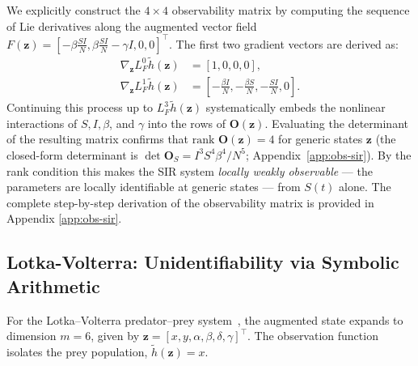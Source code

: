 We explicitly construct the $4 \times 4$ observability matrix by computing the sequence of Lie derivatives along the augmented vector field $F(\mathbf{z}) = [-\beta \frac{SI}{N}, \beta \frac{SI}{N} - \gamma I, 0, 0]^\top$. The first two gradient vectors are derived as:
\begin{align}
    \nabla_{\mathbf{z}} L_{F}^0 \tilde{h}(\mathbf{z}) &= [1, 0, 0, 0], \\
    \nabla_{\mathbf{z}} L_{F}^1 \tilde{h}(\mathbf{z}) &= \left[-\frac{\beta I}{N}, -\frac{\beta S}{N}, -\frac{SI}{N}, 0\right].
\end{align}
Continuing this process up to $L_F^3 \tilde{h}(\mathbf{z})$ systematically embeds the nonlinear interactions of $S, I, \beta$, and $\gamma$ into the rows of $\mathbf{O}(\mathbf{z})$. Evaluating the determinant of the resulting matrix confirms that $\text{rank } \mathbf{O}(\mathbf{z}) = 4$ for generic states $\mathbf{z}$ (the closed-form determinant is $\det\mathbf{O}_S=I^3S^4\beta^4/N^5$; Appendix~\ref{app:obs-sir}). By the rank condition this makes the SIR system \emph{locally weakly observable} --- the parameters are locally identifiable at generic states --- from $S(t)$ alone. The complete step-by-step derivation of the observability matrix is provided in Appendix \ref{app:obs-sir}.

\subsection{Lotka-Volterra: Unidentifiability via Symbolic Arithmetic}
For the Lotka--Volterra predator--prey system~\cite{lotka1925elements,volterra1927fluctuations}, the augmented state expands to dimension $m = 6$, given by $\mathbf{z} = [x, y, \alpha, \beta, \delta, \gamma]^\top$. The observation function isolates the prey population, $\tilde{h}(\mathbf{z}) = x$.

